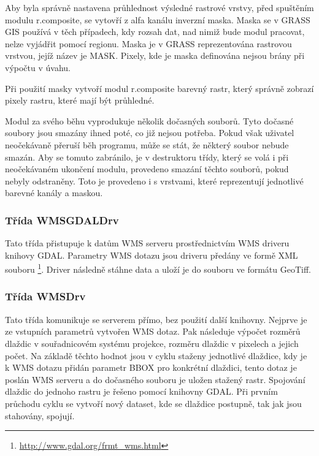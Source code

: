 \documentclass[a4paper,12pt]{article}
\begin{document}
\begin{itemize}
Aby byla správně nastavena průhlednost výsledné rastrové vrstvy, před spuštěním modulu r.composite, se vytovří z alfa kanálu inverzní maska. Maska se v GRASS GIS používá v těch případech, kdy rozsah dat, nad nimiž bude modul pracovat, nelze vyjádřit pomocí regionu. Maska je v GRASS reprezentována rastrovou vrstvou, jejíž název je MASK. Pixely, kde je maska definována 
nejsou brány při výpočtu v úvahu. 

Při použití masky vytvoří modul r.composite barevný rastr, který správně zobrazí pixely rastru, které mají být průhledné.

\end{itemize}
Modul za svého běhu vyprodukuje několik dočasných souborů. Tyto dočasné soubory jsou smazány ihned poté, co již nejsou potřeba. Pokud však uživatel neočekávaně přeruší běh programu, může se stát, že některý soubor nebude smazán. Aby se tomuto zabránilo,
je v destruktoru třídy, který se volá i při neočekávaném ukončení modulu, provedeno smazání těchto souborů, pokud nebyly odstraněny. Toto je provedeno i s vrstvami, které reprezentují jednotlivé barevné kanály a maskou. 





\subsubsection{Třída WMSGDALDrv}

Tato třída přistupuje k datům WMS serveru prostřednictvím WMS driveru knihovy GDAL. Parametry WMS dotazu jsou driveru předány ve formě XML souboru \footnote{\url{http://www.gdal.org/frmt_wms.html}}. 
Driver následně stáhne data a uloží je do souboru ve formátu GeoTiff. 



\subsubsection{Třída WMSDrv}

Tato třída komunikuje se serverem přímo, bez použití další knihovny. Nejprve je ze vstupních parametrů vytvořen WMS dotaz. 
Pak následuje výpočet rozměrů dlaždic v souřadnicovém systému projekce, rozměru dlaždic v pixelech a jejich počet. Na základě těchto hodnot jsou v cyklu staženy jednotlivé dlaždice, kdy je k WMS dotazu přidán parametr BBOX pro konkrétní dlaždici, tento dotaz je poslán WMS serveru a do dočasného
souboru je uložen stažený rastr. Spojování dlaždic do jednoho rastru je řešeno pomocí knihovny GDAL. Při prvním průchodu cyklu se vytvoří nový dataset, kde se dlaždice postupně, tak jak jsou stahovány, spojují. 
\end{document}
